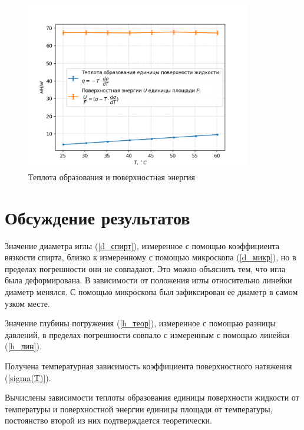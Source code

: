 \documentclass[a4paper,12pt]{article} %
\begin{document}
\begin{figure}[h!]
\begin{center}
\includegraphics[width=0.875\textwidth]{9.png}
\end{center}
\caption{Теплота образования и поверхностная энергия}
\end{figure}

\section{Обсуждение результатов}

Значение диаметра иглы (\ref{d_спирт}), измеренное с помощью коэффициента вязкости спирта, близко к измеренному с помощью микроскопа (\ref{d_микр}), но в пределах погрешности они не совпадают. Это можно объяснить тем, что игла была деформирована. В зависимости от положения иглы относительно линейки диаметр менялся. С помощью микроскопа был зафиксирован ее диаметр в самом узком месте.

Значение глубины погружения (\ref{h_теор}), измеренное с помощью разницы давлений, в пределах погрешности совпало с измеренным с помощью линейки (\ref{h_лин}).

Получена температурная зависимость коэффициента поверхностного натяжения (\ref{sigma(T)}).

Вычислены зависимости теплоты образования единицы поверхности жидкости от температуры и поверхностной энергии единицы площади от температуры, постоянство второй из них подтверждается теоретически.
\end{document}
